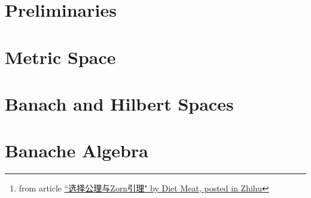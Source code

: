 \documentclass[10pt, a4paper]{article}
\begin{document}
\begin{abstract}
However, most of the Statistics undergraduate in BNU-HKBU United International College did not take the course of real analysis, only basic Multivariate Calculus, thus, there are multiple preliminary's knowledge missing. In this note, I am trying to fill the gap by covering the missing chapters and I highly recommend those students who enrol this course spend some time on Mathematical Analysis and Real Analysis, also, take some time to do the revision on Linear Algebra.

As a guide, the notes and exercises have been marked as follows:

\begin{enumerate}
    \item[$\blacktriangleright$] refers to important notes and results, also , \uline{underline} or \hl{hightlight}.
    \item[$*$] more advanced or difficult exercises that can be skipped on a first reading;
    \item[$\diamondsuit$] side remarks that can be skipped without losing any essential ideas
\end{enumerate}

\noindent``数学当中最麻烦的事情就是显然，我觉得显然，你觉得不显然这就是最麻烦的事情了”\footnote{from article \href{https://zhuanlan.zhihu.com/p/38029151}{``选择公理与Zorn引理" by Diet Meat, posted in Zhihu}}

\end{abstract}

\newpage 

\begin{multicols}{2}
\tableofcontents 
\listoftheorems[ignoreall,show=definition]
\end{multicols}

\newpage

\part{Preliminaries}



\part{Metric Space}



\part{Banach and Hilbert Spaces}


\part{Banache Algebra}


\newpage




\end{document}
